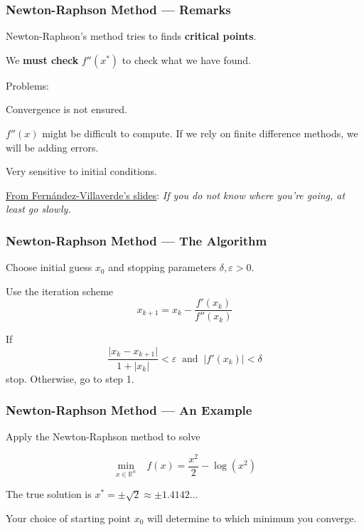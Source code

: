\documentclass[11pt,xcolor={svgnames},aspectratio=169,usepdftitle=false]{beamer}
\let\toneitemize\itemize
\let\ttwoitemize\enditemize
\renewenvironment{itemize}{\toneitemize\addtolength{\itemsep}{0.7\baselineskip}}{\ttwoitemize}
\let\toneenumer\enumerate
\let\ttwoenumer\endenumerate
\renewenvironment{enumerate}{\toneenumer\addtolength{\itemsep}{0.7\baselineskip}}{\ttwoenumer}
\begin{document}
\begin{frame}
  \frametitle{Newton-Raphson Method --- Remarks}
\begin{itemize}
  \item Newton-Raphson's method tries to finds \alert{\textbf{critical points}}.
  \item We \alert{\textbf{must check}} $f''(x^*)$ to check what we have found.
  \item Problems:
  \begin{itemize}
    \item Convergence is not ensured.
    \item $f''(x)$ might be difficult to compute. If we rely on finite difference methods, we will be adding errors.
    \item Very sensitive to initial conditions.
  \end{itemize}
  \item \href{https://www.sas.upenn.edu/~jesusfv/Lecture_NM_2_Optimization.pdf}{From Fern\'andez-Villaverde's slides}:
  \textit{If you do not know where you're going, at least go slowly.}
\end{itemize}
\end{frame}

\begin{frame}
  \frametitle{Newton-Raphson Method --- The Algorithm}
\begin{enumerate}
  \item Choose initial guess $x_0$ and stopping parameters $\delta,\varepsilon > 0$.
  \item Use the iteration scheme
  \[
  x_{k+1} = x_k - \frac{f'(x_k)}{f''(x_k)}
  \]
  \item If
    \[
    \frac{\lvert x_k - x_{k+1}\rvert}{1 + \lvert x_k \rvert} < \varepsilon \ \text{ and } \ \lvert f'(x_k)\rvert < \delta
    \]
  stop. Otherwise, go to step 1.
\end{enumerate}
\end{frame}

\begin{frame}
  \frametitle{Newton-Raphson Method --- An Example}

\begin{itemize}
  \item Apply the Newton-Raphson method to solve 

  \[
  \underset{x\in\mathbb{R}^n}{\min} \phantom{\Omega} f(x) = \frac{x^2}{2} - \log(x^2)
  \]
  \item The true solution is $x^* = \pm \sqrt{2} \approx \pm 1.4142\ldots$
  \item Your choice of starting point $x_0$ will determine to which minimum you converge.
\end{itemize}
\end{frame}
\end{document}
